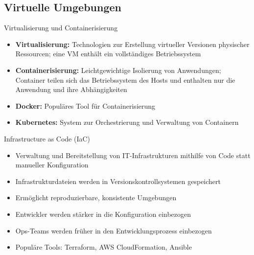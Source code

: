 \subsection{Virtuelle Umgebungen}

\begin{concept}{Virtualisierung und Containerisierung}\\
    \begin{itemize}
        \item \textbf{Virtualisierung:} Technologien zur Erstellung virtueller Versionen physischer Ressourcen; eine VM enthält ein vollständiges Betriebssystem
        
        \item \textbf{Containerisierung:} Leichtgewichtige Isolierung von Anwendungen; Container teilen sich das Betriebssystem des Hosts und enthalten nur die Anwendung und ihre Abhängigkeiten
        
        \item \textbf{Docker:} Populäres Tool für Containerisierung
        
        \item \textbf{Kubernetes:} System zur Orchestrierung und Verwaltung von Containern
    \end{itemize}
\end{concept}

\begin{concept}{Infrastructure as Code (IaC)}\\
    \begin{itemize}
        \item Verwaltung und Bereitstellung von IT-Infrastrukturen mithilfe von Code statt manueller Konfiguration
        \item Infrastrukturdateien werden in Versionskontrollsystemen gespeichert
        \item Ermöglicht reproduzierbare, konsistente Umgebungen
        \item Entwickler werden stärker in die Konfiguration einbezogen
        \item Ops-Teams werden früher in den Entwicklungsprozess einbezogen
        \item Populäre Tools: Terraform, AWS CloudFormation, Ansible
    \end{itemize}
\end{concept}

